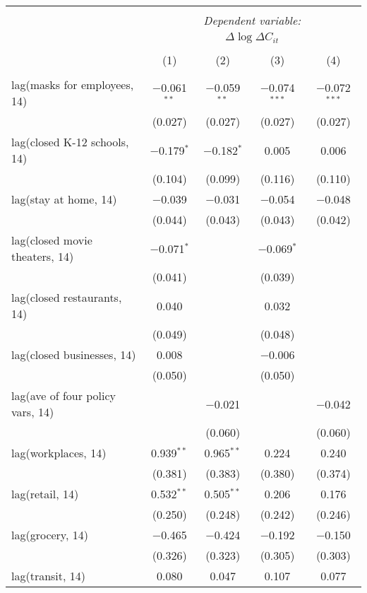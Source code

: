 \begin{tabular}{@{\extracolsep{1pt}}lcccc} 
\\[-1.8ex]\hline 
\hline \\[-1.8ex] 
 & \multicolumn{4}{c}{\textit{Dependent variable:}} \\ 
\cline{2-5} 
 & \multicolumn{4}{c}{$\Delta \log \Delta C_{it}$} \\ 
\\[-1.8ex] & (1) & (2) & (3) & (4)\\ 
\hline \\[-1.8ex] 
 lag(masks for employees, 14) & $-$0.061$^{**}$ & $-$0.059$^{**}$ & $-$0.074$^{***}$ & $-$0.072$^{***}$ \\ 
  & (0.027) & (0.027) & (0.027) & (0.027) \\ 
  lag(closed K-12 schools, 14) & $-$0.179$^{*}$ & $-$0.182$^{*}$ & 0.005 & 0.006 \\ 
  & (0.104) & (0.099) & (0.116) & (0.110) \\ 
  lag(stay at home, 14) & $-$0.039 & $-$0.031 & $-$0.054 & $-$0.048 \\ 
  & (0.044) & (0.043) & (0.043) & (0.042) \\ 
  lag(closed movie theaters, 14) & $-$0.071$^{*}$ &  & $-$0.069$^{*}$ &  \\ 
  & (0.041) &  & (0.039) &  \\ 
  lag(closed restaurants, 14) & 0.040 &  & 0.032 &  \\ 
  & (0.049) &  & (0.048) &  \\ 
  lag(closed businesses, 14) & 0.008 &  & $-$0.006 &  \\ 
  & (0.050) &  & (0.050) &  \\ 
  lag(ave of four policy vars, 14) &  & $-$0.021 &  & $-$0.042 \\ 
  &  & (0.060) &  & (0.060) \\ 
  lag(workplaces, 14) & 0.939$^{**}$ & 0.965$^{**}$ & 0.224 & 0.240 \\ 
  & (0.381) & (0.383) & (0.380) & (0.374) \\ 
  lag(retail, 14) & 0.532$^{**}$ & 0.505$^{**}$ & 0.206 & 0.176 \\ 
  & (0.250) & (0.248) & (0.242) & (0.246) \\ 
  lag(grocery, 14) & $-$0.465 & $-$0.424 & $-$0.192 & $-$0.150 \\ 
  & (0.326) & (0.323) & (0.305) & (0.303) \\ 
  lag(transit, 14) & 0.080 & 0.047 & 0.107 & 0.077 \\ 

\end{tabular}
